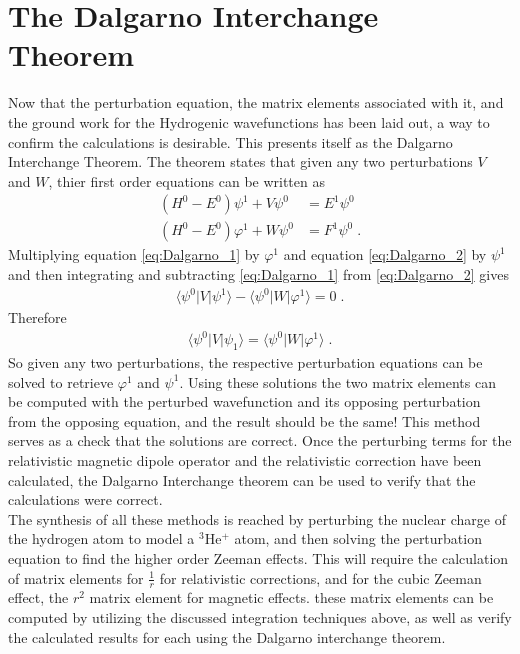     \section{The Dalgarno Interchange Theorem} \label{sec:Dalgarno_Interchange_Theorem}
        Now that the perturbation equation, the matrix elements associated with it, and the ground work for the Hydrogenic wavefunctions has been laid out, a way to confirm the calculations is desirable. This presents itself as the Dalgarno Interchange Theorem. The theorem states that given any two perturbations $V$ and $W$, thier first order equations can be written as
        \begin{align}
            \left( H^0 - E^0 \right) \psi^1 + V \psi^0 &= E^1 \psi^0 \label{eq:Dalgarno_1}\\
            \left( H^0 - E^0 \right) \varphi^1 + W \psi^0 &= F^1 \psi^0 \label{eq:Dalgarno_2}\;.
        \end{align}
        \noindent Multiplying equation \eqref{eq:Dalgarno_1} by $\varphi^1$ and equation \eqref{eq:Dalgarno_2} by $\psi^1$ and then integrating and subtracting \eqref{eq:Dalgarno_1} from \eqref{eq:Dalgarno_2} gives
        \begin{align}
            \langle \psi^0 \vert V \vert \psi^1 \rangle - \langle \psi^0 \vert W \vert \varphi^1 \rangle = 0\;.
        \end{align}
        \noindent Therefore 
        \begin{align}
            \langle \psi^0 \vert V \vert \psi_1 \rangle = \langle \psi^0 \vert W \vert \varphi^1 \rangle\;.
        \end{align}
        \noindent So given any two perturbations, the respective perturbation equations can be solved to retrieve $\varphi^1$ and $\psi^1$. Using these solutions the two matrix elements can be computed with the perturbed wavefunction and its opposing perturbation from the opposing equation, and the result should be the same! This method serves as a check that the solutions are correct. Once the perturbing terms for the relativistic magnetic dipole operator and the relativistic correction have been calculated, the Dalgarno Interchange theorem can be used to verify that the calculations were correct.\\

        The synthesis of all these methods is reached by perturbing the nuclear charge of the hydrogen atom to model a $^3$He$^+$ atom, and then solving the perturbation equation to find the higher order Zeeman effects. This will require the calculation of matrix elements for $\frac{1}{r}$ for relativistic corrections, and for the cubic Zeeman effect, the $r^2$ matrix element for magnetic effects. these matrix elements can be computed by utilizing the discussed integration techniques above, as well as verify the calculated results for each using the Dalgarno interchange theorem.
    
